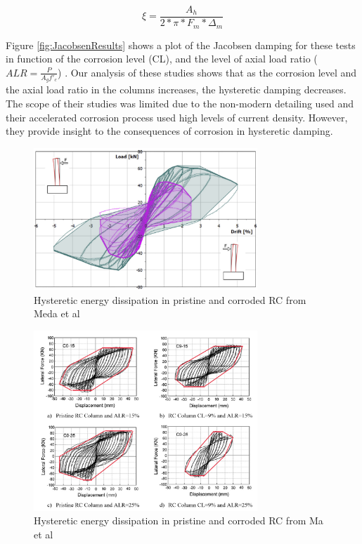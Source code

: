 \begin{equation}
    \xi=\frac{A_h}{2*\pi*F_m*\Delta_m}
    \label{eq:JacobsenEquation}
\end{equation}

Figure \ref{fig:JacobsenResults} shows a plot of the Jacobsen damping for these tests in function of the corrosion level (CL), and the level of axial load ratio ($ALR=\frac{P}{A_{g}f'_{c}}$) . Our analysis of these studies shows that as the corrosion level and the axial load ratio in the columns increases, the hysteretic damping decreases. The scope of their studies was limited due to the non-modern detailing used and their accelerated corrosion process used high levels of current density. However, they provide insight to the consequences of corrosion in hysteretic damping. 

\begin{figure}[htbp]
	\centering
    \includegraphics[width=0.75\textwidth]{VAC Prelim 2.0/Chapter-5/figs/Meda_HystereticArea_01.png}
	\caption{Hysteretic energy dissipation in pristine and corroded RC from Meda et al \cite{Meda2014}}
	\label{fig:MedaJacobsen}
\end{figure}

\begin{figure}[htbp]
	\centering
    \includegraphics[width=0.75\textwidth]{VAC Prelim 2.0/Chapter-5/figs/Ma_HystereticArea_01.png}
	\caption{Hysteretic energy dissipation in pristine and corroded RC from Ma et al \cite{Meda2014}}
	\label{fig:MaJacobsen}
\end{figure}


